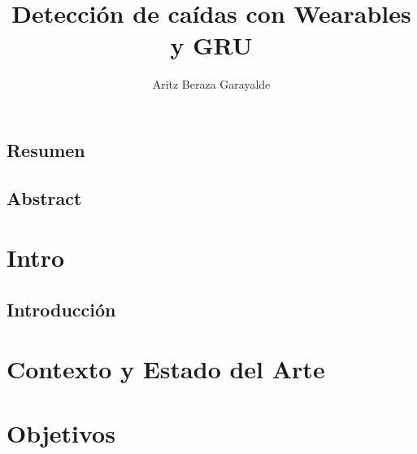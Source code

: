 \documentclass[11pt,a4paper,spanish]{book}
\title{Detección de caídas con Wearables y GRU}
\author{Aritz Beraza Garayalde}
\date{\currenttime}
\begin{document}
\renewcommand{\listfigurename}{Índice de Ilustraciones}
\renewcommand{\listtablename}{Índice de Tablas}
\renewcommand{\contentsname}{Índice de Contenidos}
\renewcommand{\figurename}{Figura}
\renewcommand{\tablename}{Tabla}

\maketitle
\frontmatter
\tableofcontents
\listoffigures
\listoftables

\mainmatter

\section*{Resumen}


\section*{Abstract}



\chapter{Intro}\label{chap:intro}
\section{Introducción}


\chapter{Contexto y Estado del Arte}\label{chap:stateofart}


\chapter{Objetivos}\label{chap:objetivos}

\end{document}
